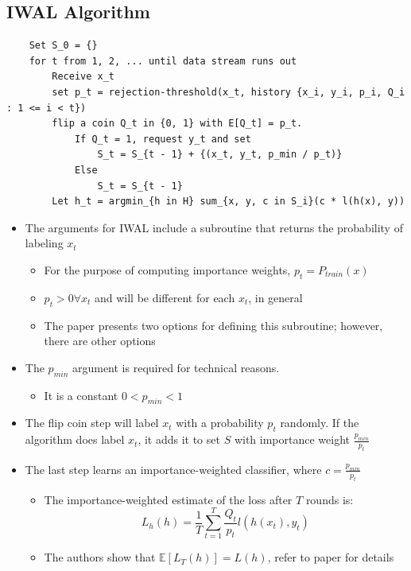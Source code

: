 \documentclass[10pt]{article}
\begin{document}
\subsection*{IWAL Algorithm}
\begin{verbatim}
    Set S_0 = {}
    for t from 1, 2, ... until data stream runs out
        Receive x_t
        set p_t = rejection-threshold(x_t, history {x_i, y_i, p_i, Q_i : 1 <= i < t})
        flip a coin Q_t in {0, 1} with E[Q_t] = p_t.  
            If Q_t = 1, request y_t and set
                S_t = S_{t - 1} + {(x_t, y_t, p_min / p_t)}
            Else
                S_t = S_{t - 1}
        Let h_t = argmin_{h in H} sum_{x, y, c in S_i}(c * l(h(x), y))
\end{verbatim}
\begin{itemize}
	\item The arguments for IWAL include a subroutine that returns the probability of labeling $x_t$
	\begin{itemize}
	    \item For the purpose of computing importance weights, $p_t = P_{train}(x)$
	    \item $p_t > 0 \forall x_t$ and will be different for each $x_t$, in general
	    \item The paper presents two options for defining this subroutine; however, there are other options
    \end{itemize}
    \item The $p_{min}$ argument is required for technical reasons.
    \begin{itemize}
	    \item It is a constant $0 < p_{min} < 1$
    \end{itemize}
    \item The flip coin step will label $x_t$ with a probability $p_t$ randomly.  If the algorithm does label $x_t$, it adds it to set $S$ with importance weight $\frac{p_{min}}{p_t}$
    \item The last step learns an importance-weighted classifier, where $c = \frac{p_{min}}{p_t}$
    \begin{itemize}
	    \item The importance-weighted estimate of the loss after $T$ rounds is:
	    \[L_h(h) = \frac{1}{T} \sum_{t = 1}^T \frac{Q_t}{p_t} l(h(x_t), y_t)\]
        \item The authors show that $\mathbb{E}[L_T(h)] = L(h)$, refer to paper for details
    \end{itemize}
\end{itemize}
\end{document}
